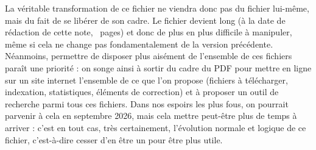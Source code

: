 La véritable transformation de ce fichier ne viendra donc pas du fichier lui-même, mais du fait de se libérer de son cadre. Le fichier devient long (à la date de rédaction de cette note, ~pages) et donc de plus en plus difficile à manipuler, même si cela ne change pas fondamentalement de la version précédente. Néanmoins, permettre de disposer plus aisément de l'ensemble de ces fichiers paraît une priorité : on songe ainsi à sortir du cadre du PDF pour mettre en ligne sur un site internet l'ensemble de ce que l'on propose (fichiers  à télécharger, indexation, statistiques, éléments de correction) et à proposer un outil de recherche parmi tous ces fichiers. Dans nos espoirs les plus fous, on pourrait parvenir à cela en septembre 2026, mais cela mettre peut-être plus de temps à arriver : c'est en tout cas, très certainement, l'évolution normale et logique de ce fichier, c'est-à-dire cesser d'en être un pour être plus utile.